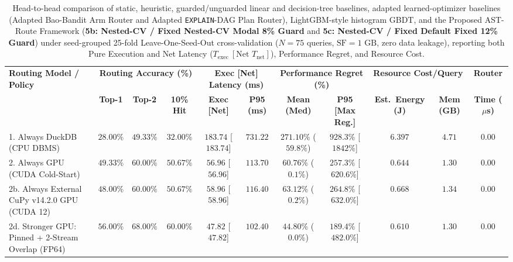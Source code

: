 \documentclass[10pt,a4paper]{article}
\newenvironment{fitasttable}{%
  \begin{lrbox}{\asttblbox}%
}{%
  \end{lrbox}%
  \sbox{\asttblboxB}{%
    \ifdim\wd\asttblbox>0.96\textwidth
      \resizebox{0.96\textwidth}{!}{\usebox{\asttblbox}}%
    \else
      \usebox{\asttblbox}%
    \fi
  }%
  \ifdim\ht\asttblboxB>0.72\textheight
    \resizebox{!}{0.72\textheight}{\usebox{\asttblboxB}}%
  \else
    \usebox{\asttblboxB}%
  \fi
}
\begin{document}
\begin{enumerate}[leftmargin=1.5em,itemsep=1pt]
\end{enumerate}

\begin{table}[!htbp]
\centering
\caption{Head-to-head comparison of static, heuristic, guarded/unguarded linear and decision-tree baselines, adapted learned-optimizer baselines (Adapted Bao-Bandit Arm Router and Adapted \texttt{EXPLAIN}-DAG Plan Router), LightGBM-style histogram GBDT, and the Proposed AST-Route Framework (\textbf{5b: Nested-CV / Fixed Nested-CV Modal 8\% Guard} and \textbf{5c: Nested-CV / Fixed Default Fixed 12\% Guard}) under seed-grouped 25-fold Leave-One-Seed-Out cross-validation ($N=75$ queries, $\text{SF}=1\text{ GB}$, zero data leakage), reporting both Pure Execution and Net Latency ($T_{\text{exec}}\ [\text{Net } T_{\text{net}}]$), Performance Regret, and Resource Cost.}\label{tab:jbd_routing_t8}
\label{tab:routing_evaluation}\label{tab:query_routing}\label{tab:router_eval}
\scriptsize
\setlength{\tabcolsep}{2.7pt}
\renewcommand{\arraystretch}{1.07}
\begin{fitasttable}
\begin{tabular}{@{}lcccccccccc@{}}
\toprule
\multirow{2}{*}{\textbf{Routing Model / Policy}} & \multicolumn{3}{c}{\textbf{Routing Accuracy (\%)}} & \multicolumn{2}{c}{\textbf{Exec [Net] Latency (ms)}} & \multicolumn{2}{c}{\textbf{Performance Regret (\%)}} & \multicolumn{2}{c}{\textbf{Resource Cost/Query}} & \textbf{Router} \\
\cmidrule(lr){2-4} \cmidrule(lr){5-6} \cmidrule(lr){7-8} \cmidrule(lr){9-10} \cmidrule(lr){11-11}
 & \textbf{Top-1} & \textbf{Top-2} & \textbf{10\% Hit} & \textbf{Exec [Net]} & \textbf{P95 (ms)} & \textbf{Mean (Med)} & \textbf{P95 [Max Reg.]} & \textbf{Est.\ Energy (J)} & \textbf{Mem (GB)} & \textbf{Time ($\mu$s)} \\
\midrule
1. Always DuckDB (CPU DBMS) & $28.00\%$ & $49.33\%$ & $32.00\%$ & $183.74$ [$183.74$] & $731.22$ & $271.10\%$ ($59.8\%$) & $928.3\%$ [$1842\%$] & $6.397$ & $4.71$ & $0.00$ \\
2. Always GPU (CUDA Cold-Start) & $49.33\%$ & $60.00\%$ & $50.67\%$ & $56.96$ [$56.96$] & $113.70$ & $60.76\%$ ($0.1\%$) & $257.3\%$ [$620.6\%$] & $0.644$ & $1.30$ & $0.00$ \\
2b. Always External CuPy v14.2.0 GPU (CUDA 12) & $48.00\%$ & $60.00\%$ & $50.67\%$ & $58.96$ [$58.96$] & $116.40$ & $63.12\%$ ($0.2\%$) & $264.8\%$ [$632.0\%$] & $0.668$ & $1.34$ & $0.00$ \\
2d. Stronger GPU: Pinned + 2-Stream Overlap (FP64) & $56.00\%$ & $68.00\%$ & $60.00\%$ & $47.82$ [$47.82$] & $102.40$ & $44.80\%$ ($0.0\%$) & $189.4\%$ [$482.0\%$] & $0.610$ & $1.30$ & $0.00$ \\

\end{tabular}
\end{fitasttable}
\end{table}
\end{document}
